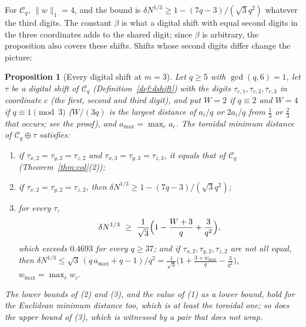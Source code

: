 \documentclass[11pt]{amsart}
\newtheorem{proposition}[theorem]{Proposition}
\theoremstyle{definition}
\theoremstyle{plain}
\begin{document}
For $\mathcal C_q$, $\|w\|_1=4$, and the bound is $\delta N^{1/3}\ge1-(7q-3)/(\sqrt3q^2)$ whatever the third digits. The constant $\beta$ is what a digital shift with equal second digits in the three coordinates adds to the shared digit; since $\beta$ is arbitrary, the proposition also covers these shifts. Shifts whose second digits differ change the picture:

\begin{proposition}[Every digital shift at $m=3$]\label{prop:colshift}
Let $q\ge5$ with $\gcd(q,6)=1$, let $\tau$ be a digital shift of $\mathcal C_q$ (Definition~\ref{def:dshift}) with the digits $\tau_{c,1},\tau_{c,2},\tau_{c,3}$ in coordinate $c$ (the first, second and third digit), and put $W=2$ if $q\equiv2$ and $W=4$ if $q\equiv1\pmod3$ ($W/(3q)$ is the largest distance of $a_i/q$ or $2a_i/q$ from $\frac13$ or $\frac23$ that occurs; see the proof), and $a_{\max}=\max_ca_c$. The toroidal minimum distance of $\mathcal C_q\oplus\tau$ satisfies:
\begin{enumerate}
\item if $\tau_{x,2}=\tau_{y,2}=\tau_{z,2}$ and $\tau_{x,3}=\tau_{y,3}=\tau_{z,3}$, it equals that of $\mathcal C_q$ (Theorem~\ref{thm:col}(2));
\item if $\tau_{x,2}=\tau_{y,2}=\tau_{z,2}$, then $\delta N^{1/3}\ge1-(7q-3)/(\sqrt3q^2)$;
\item for every $\tau$,
\[
\delta N^{1/3}\ \ge\ \frac1{\sqrt3}\Bigl(1-\frac{W+3}q+\frac3{q^2}\Bigr),
\]
which exceeds $0.4693$ for every $q\ge37$; and if $\tau_{x,2},\tau_{y,2},\tau_{z,2}$ are not all equal, then $\delta N^{1/3}\le\sqrt3\,(q\,a_{\max}+q-1)/q^2=\frac1{\sqrt3}\bigl(1+\frac{3+w_{\max}}q-\frac3{q^2}\bigr)$, $w_{\max}=\max_cw_c$.
\end{enumerate}
The lower bounds of (2) and (3), and the value of (1) as a lower bound, hold for the Euclidean minimum distance too, which is at least the toroidal one; so does the upper bound of (3), which is witnessed by a pair that does not wrap.
\end{proposition}
\end{document}
